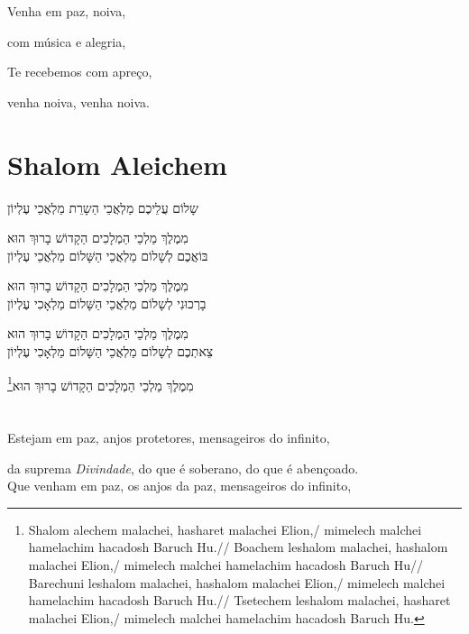 \movetooddpage
\raggedright

Venha em paz, noiva,

com música e alegria,

Te recebemos com apreço,

venha noiva, venha noiva.

\movetoevenpage
\raggedleft

\section{Shalom Aleichem}

שָלוֹם עֲלֵיכֶם מַלְאֲכֵי הַשָרֵת מַלְאֲכֵי עֶלְיוֹן

מִמֶלֶךְ מַלְכֵי הַמְלָכִים הַקָדוֹשׁ בָרוּךְ הוּא\\[10pt]

בּוֹאֲכֶם לְשָׁלוֹם מַלְאֲכֵי הַשָּׁלוֹם מַלְאֲכֵי עֶלְיוֹן

מִמֶלֶךְ מַלְכֵי הַמְלָכִים הַקָדוֹשׁ בָרוּךְ הוּא\\[10pt]

בָרְכוּנִי לְשָלוֹם מַלְאֲכֵי הַשָּׁלוֹם מַלְאָכִי עֶלְיוֹן

מִמֶלֶךְ מַלְכֵי הַמְלָכִים הַקָדוֹשׁ בָרוּךְ הוּא\\[10pt]

צֵאתְכֶם לְשָלוֹם מַלְאֲכֵי הַשָּׁלוֹם מַלְאָכִי עֶלְיוֹן

מִמֶלֶךְ מַלְכֵי הַמְלָכִים הַקָדוֹשׁ בָרוּךְ הוּא\footnote{
Shalom alechem malachei, hasharet malachei Elion,/
mimelech malchei hamelachim hacadosh Baruch Hu.//
Boachem leshalom malachei, hashalom malachei Elion,/
mimelech malchei hamelachim hacadosh Baruch Hu//
Barechuni leshalom malachei, hashalom malachei Elion,/
mimelech malchei hamelachim hacadosh Baruch Hu.//
Tsetechem leshalom malachei, hasharet malachei Elion,/
mimelech malchei hamelachim hacadosh Baruch Hu.}

\movetooddpage
\raggedright

\section{}

Estejam em paz, anjos protetores, mensageiros do \qb{}infinito,

da suprema \emph{Divindade}, do que é soberano, do que é \qb{}abençoado.\\[10pt]

Que venham em paz, os anjos da paz, mensageiros do \qb{}infinito,

